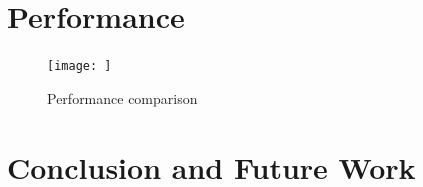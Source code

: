 \documentclass{sig-alternate}
\begin{document}
\section{Performance}


\begin{figure}
 \centering
\texttt{[image: ]} 

\caption{\small Performance comparison}
  \label{fig:comp-pj-saga-mr} 
\end{figure}

\section{Conclusion and Future Work}


%  
\end{document}
